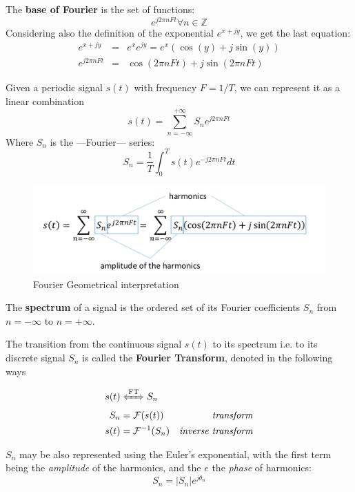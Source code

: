 The \textbf{base of Fourier} is the set of functions:
\begin{equation}
   e^{j2\pi n F t} \forall n \in \mathbb{Z}
\end{equation}
Considering also the definition of the exponential $e^{x + jy}$, we get the last equation:
\begin{align}
   e^{x + jy} & = & e^x e^{jy} =e^x(\cos(y) + j\sin(y))\\
   e^{j2\pi n F t} & = & \cos(2\pi n F t) + j\sin(2\pi n F t)
\end{align}
\nl


\newpage
\begin{definition}
   Given a periodic signal $s(t)$ with frequency $F = 1/T$, we can represent it as a linear combination
   \begin{equation}
      s(t) = \sum_{n=-\infty}^{+\infty} S_n e^{j2\pi n F t}
   \end{equation} 
   Where $S_n$ is the ---Fourier--- series:
   \begin{equation}
      S_n = \frac{1}{T} \int_0^T s(t) e^{-j2\pi n F t} dt
   \end{equation}
\end{definition}

\begin{figure}[htbp]
   \centering
   \includegraphics{images/fourier_geometric.png}
   \caption{Fourier Geometrical interpretation}
   \label{fig:fourier_geometric}
\end{figure}

\begin{definition}
   The \textbf{spectrum} of a signal is the ordered set of its Fourier coefficients $S_n$ from $n = -\infty$ to $n = +\infty$.
\end{definition}

\begin{definition}
   The transition from the continuous signal $s(t)$ to its spectrum i.e. to its discrete signal $S_n$ is called the \textbf{Fourier Transform}, denoted in the following ways

   \begin{align}
      s(t) & \xLeftrightarrow{\text{FT}} S_n\\
      S_n & = \mathcal{F}(s(t)) & \textit{transform}\\
      s(t) & = \mathcal{F}^{-1}(S_n) & \textit{inverse transform}
   \end{align}
\end{definition}

$S_n$ may be also represented using the Euler's exponential, with the first term being the \textit{amplitude} of the harmonics, and the $e$ the \textit{phase} of harmonics:
\begin{equation}
   S_n=|S_n|e^{j\theta_n}
\end{equation}